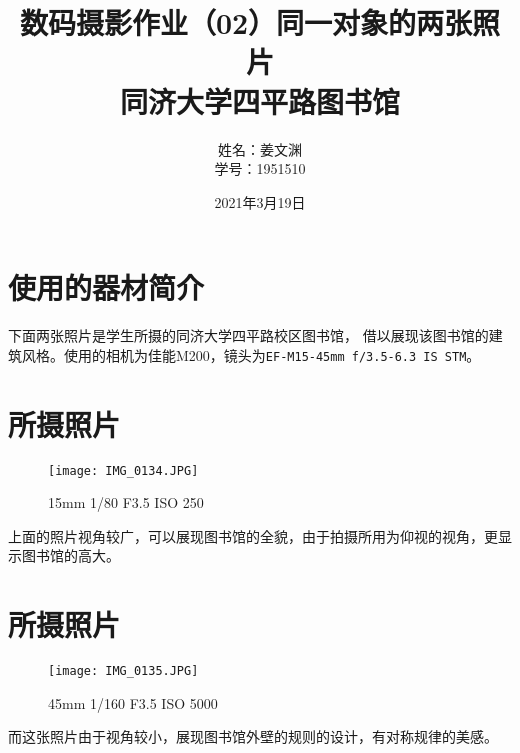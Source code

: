 \documentclass[cn,black,9pt,normal]{elegantnote}
\title{数码摄影作业（02）同一对象的两张照片\\\small{同济大学四平路图书馆}}
\author{姓名：姜文渊\\学号：1951510}
\date{2021年3月19日}
\begin{document}
\maketitle


\section*{使用的器材简介}

下面两张照片是学生所摄的同济大学四平路校区图书馆，
借以展现该图书馆的建筑风格。使用的相机为佳能M200，镜头为\texttt{EF-M15-45mm f/3.5-6.3 IS STM}。

\section{所摄照片}
\begin{figure}[H]
    \centering
    \texttt{[image: IMG\_0134.JPG]}
    \caption{15mm 1/80 F3.5 ISO 250}
    \label{F-01}
\end{figure}

上面的照片视角较广，可以展现图书馆的全貌，由于拍摄所用为仰视的视角，更显示图书馆的高大。
\section{所摄照片}
\begin{figure}[H]
    \centering
    \texttt{[image: IMG\_0135.JPG]}
    \caption{45mm 1/160 F3.5 ISO 5000}
    \label{F-02}
\end{figure}

而这张照片由于视角较小，展现图书馆外壁的规则的设计，有对称规律的美感。

\end{document}
